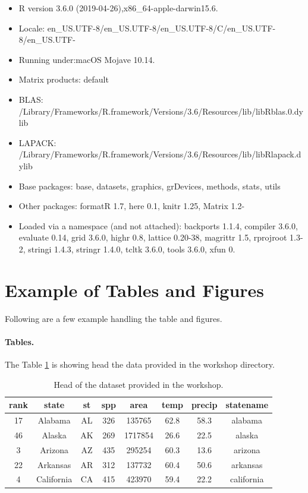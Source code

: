 \documentclass[12pt]{article}
\begin{document}
\begin{itemize}
      \item
            R version 3.6.0 (2019-04-26),x86\_64-apple-darwin15.6.
      \item
            Locale:
            en\_US.UTF-8/en\_US.UTF-8/en\_US.UTF-8/C/en\_US.UTF-8/en\_US.UTF-
      \item
            Running under:macOS Mojave 10.14.
      \item
            Matrix products: default
      \item
            BLAS:
            /Library/Frameworks/R.framework/Versions/3.6/Resources/lib/libRblas.0.dylib
      \item
            LAPACK:
            /Library/Frameworks/R.framework/Versions/3.6/Resources/lib/libRlapack.dylib
      \item
            Base packages: base, datasets, graphics, grDevices, methods, stats,
            utils
      \item
            Other packages: formatR 1.7, here 0.1, knitr 1.25, Matrix 1.2-
      \item
            Loaded via a namespace (and not attached): backports 1.1.4, compiler
            3.6.0, evaluate 0.14, grid 3.6.0, highr 0.8, lattice 0.20-38, magrittr
            1.5, rprojroot 1.3-2, stringi 1.4.3, stringr 1.4.0, tcltk 3.6.0, tools
            3.6.0, xfun 0.
\end{itemize}

\section{Example of Tables and Figures}

Following are a few example handling the table and figures.

\paragraph*{Tables.}  The Table \ref{table:1} is showing head the data provided in the workshop directory.

\begin{table}[h!]
      \centering
      \begin{tabular}{||c c c c c c c c||}
            \hline
            rank & state      & st & spp & area    & temp & precip & statename  \\ [0.5ex]
            \hline\hline
            17   & Alabama    & AL & 326 & 135765  & 62.8 & 58.3   & alabama    \\
            46   & Alaska     & AK & 269 & 1717854 & 26.6 & 22.5   & alaska     \\
            3    & Arizona    & AZ & 435 & 295254  & 60.3 & 13.6   & arizona    \\
            22   & Arkansas   & AR & 312 & 137732  & 60.4 & 50.6   & arkansas   \\
            4    & California & CA & 415 & 423970  & 59.4 & 22.2   & california \\
            \hline
      \end{tabular}
      \caption{Head of the dataset provided in the workshop.}
      \label{table:1}
\end{table}
\end{document}
